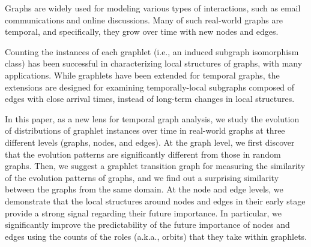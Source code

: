Graphs are widely used for modeling various types of interactions, such as email communications and online discussions. Many of such real-world graphs are temporal, and specifically, they grow over time with new nodes and edges.

Counting the instances of each graphlet (i.e., an induced subgraph isomorphism class) has been successful in characterizing local structures of graphs, with many applications. While graphlets have been extended for temporal graphs, the extensions are designed for examining temporally-local subgraphs composed of edges with close arrival times, instead of long-term changes in local structures.

In this paper, as a new lens for temporal graph analysis, we study the evolution of distributions of graphlet instances over time in real-world graphs at three different levels (graphs, nodes, and edges). At the graph level, we first discover that the evolution patterns are significantly different from those in random graphs. Then, we suggest a graphlet transition graph for measuring the similarity of the evolution patterns of graphs, and we find out a surprising similarity between the graphs from the same domain. At the node and edge levels, we demonstrate that the local structures around nodes and edges in their early stage provide a strong signal regarding their future importance. In particular, we significantly improve the predictability of the future importance of nodes and edges using the counts of the roles (a.k.a., orbits) that they take within graphlets.